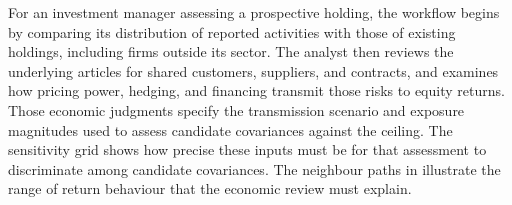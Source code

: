 

For an investment manager assessing a prospective holding, the workflow
begins by comparing its distribution of reported activities with those of
existing holdings, including firms outside its sector.
The analyst then reviews the underlying articles for shared customers,
suppliers, and contracts, and examines how pricing power, hedging, and
financing transmit those risks to equity returns.
Those economic judgments specify the transmission scenario and exposure
magnitudes used to assess candidate covariances against the ceiling.
The sensitivity grid shows how precise these inputs must be for that
assessment to discriminate among candidate covariances.
The neighbour paths in  illustrate
the range of return behaviour that the economic review must explain.
